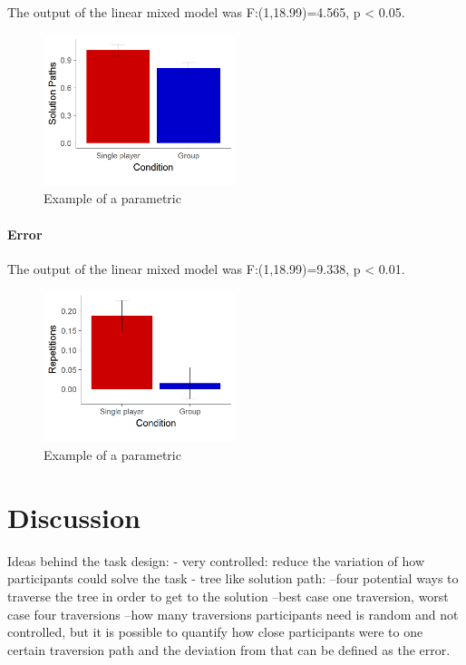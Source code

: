 \documentclass{article}
\begin{document}
The output of the linear mixed model was F:(1,18.99)=4.565, p < 0.05.


\begin{figure}[h]
\centering
\includegraphics[width=0.5\textwidth]{results_solution_paths}
\caption{Example of a parametric }
\end{figure}

\paragraph{Error}

The output of the linear mixed model was F:(1,18.99)=9.338, p < 0.01.


\begin{figure}[h]
\centering
\includegraphics[width=0.5\textwidth]{results_un_error}
\caption{Example of a parametric }
\end{figure}


\section{Discussion}
Ideas behind the task design:
- very controlled: reduce the variation of how participants could solve the task
- tree like solution path: 
--four potential ways to traverse the tree in order to get to the solution
--best case one traversion, worst case four traversions
--how many traversions participants need is random and not controlled, but it is possible to quantify how close participants were to one certain traversion path and the deviation from that can be defined as the error.



\end{document}
